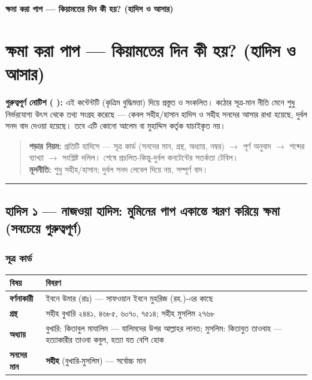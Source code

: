 

\begin{center}{\Large\bfseries\color{emerald} ক্ষমা করা পাপ — কিয়ামতের দিন কী হয়? (হাদিস ও আসার)}\end{center}
\vspace{1em}
\section*{ক্ষমা করা পাপ — কিয়ামতের দিন কী হয়? (হাদিস ও আসার)}

\begin{warnbox}
 \textbf{গুরুত্বপূর্ণ নোটিশ ( ):} এই কন্টেন্টটি  (কৃত্রিম বুদ্ধিমত্তা) দিয়ে প্রস্তুত ও সংকলিত।  কঠোর সূত্র-মান নীতি মেনে শুধু নির্ভরযোগ্য উৎস থেকে তথ্য সংগ্রহ করেছে — কেবল সহীহ/হাসান হাদিস ও সহীহ সনদের আসার রাখা হয়েছে, দুর্বল সনদ বাদ দেওয়া হয়েছে। তবে এটি কোনো আলেম বা মুহাদ্দিস কর্তৃক যাচাইকৃত নয়।
\end{warnbox}

\begin{quote}
\textbf{পড়ার নিয়ম:} প্রতিটি হাদিসে — সূত্র কার্ড (সনদের মান, গ্রন্থ, অধ্যায়, নম্বর) $\rightarrow$ পূর্ণ অনুবাদ $\rightarrow$ শব্দের ব্যাখ্যা $\rightarrow$ সংশ্লিষ্ট দলিল। শেষে প্রচলিত-কিন্তু-দুর্বল কনটেন্টের সতর্কতা টেবিল। \\
\textbf{মূলনীতি:} শুধু সহীহ/হাসান; দুর্বল সনদ লেবেল দিয়ে নয়, সম্পূর্ণ বাদ।
\end{quote}

\medskip\hrule\medskip

\subsection*{হাদিস ১ — নাজওয়া হাদিস: মুমিনের পাপ একান্তে স্মরণ করিয়ে ক্ষমা (সবচেয়ে গুরুত্বপূর্ণ)}

\subsubsection*{সূত্র কার্ড}

\begin{table}[h]\centering\small
\begin{tabular}{ll}
বিষয় & বিবরণ \\
\hline
\textbf{বর্ণনাকারী} & ইবনে উমার (রাঃ) — সাফওয়ান ইবনে মুহরিজ (রহ.)-এর কাছে \\
\textbf{গ্রন্থ} & সহীহ বুখারি ২৪৪১, ৪৬৮৫, ৬০৭০, ৭৫১৪; সহীহ মুসলিম ২৭৬৮ \\
\textbf{অধ্যায়} & বুখারি: কিতাবুল মাযালিম — \lat{“}যালিমদের উপর আল্লাহর লানত\lat{”}; মুসলিম: কিতাবুত তাওবাহ — \lat{“}হত্যাকারীর তাওবা কবুল, হত্যা যত বেশি হোক\lat{”} \\
\textbf{সনদের মান} & \textbf{সহীহ} (বুখারি-মুসলিম) — সর্বোচ্চ মান \\
\hline
\end{tabular}
\end{table}

